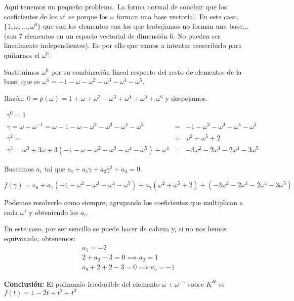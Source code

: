 \begin{problem}[4]
Aquí tenemos un pequeño problema. La forma normal de concluir que los coeficientes de los $\omega^i$ es porque los $ω$ forman una base vectorial. En este caso, $\{1,ω,...,ω^6\}$ que son los elementos con los que trabajamos no forman una base... (son 7 elementos en un espacio vectorial de dimensión 6. No pueden ser linealmente independientes). Es por ello que vamos a intentar reescribirlo para quitarnos el $ω^6$. 

Sustituimos $ω^6$ por su combinación lineal respecto del resto de elementos de la base, que es $ω^6 = -1-ω-ω^2-ω^3-ω^4-ω^5$.

Razón: $0 = p(ω) = 1+ω+ω^2 + ω^3 + ω^4+ω^5+ω^6$ y despejamos.


\[\begin{array}{lcc}
γ^0 = 1&\\
γ = ω+ω^{-1} = ω -1-ω-ω^2-ω^3-ω^4-ω^5 &=& -1 -ω^2-ω^3-ω^4-ω^5 \\
γ^2 = &=& ω^2 + ω^5 + 2\\
γ^3 = ω^3 + 3ω + 3(-1-ω-ω^2-ω^3-ω^4-ω^5) + ω^4 &=& -3ω^2 -2ω^3 -2ω^4-3ω^5
\end{array}\]

Buscamos $a_i$ tal que $a₀ + a₁γ + a₂γ^2 + a_3 = 0$.

$$f(γ) = a_0 + a_1 (-1 -ω^2-ω^3-ω^4-ω^5) + a_2 ( ω^2 + ω^5 + 2) + (-3ω^2 -2ω^3 -2ω^4-3ω^5)$$

Podemos resolverlo como siempre, agrupando los coeficientes que multiplican a cada $ω^i$ y obteniendo los $a_i$.

En este caso, por ser sencillo se puede hacer de cabeza y, si no nos hemos equivocado, obtenemos:
\[\begin{array}{l}
a_1 = -2\\2+a_2 -3 = 0 \implies a_2 = 1\\a₀ + 2 + 2 -3 = 0 \implies a₀=-1
\end{array}\]


\textbf{Conclusión: } El polinomio irreducible del elemento $ω+ω^{-1}$ sobre $K^H$ es $f(t) = 1-2t+t^2+t^3$
\end{problem}


